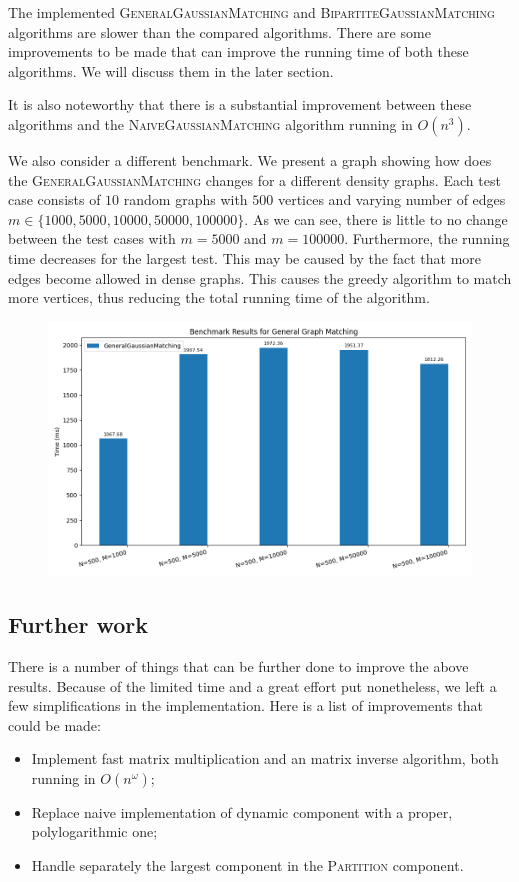 The implemented \textsc{GeneralGaussianMatching} and \textsc{BipartiteGaussianMatching} algorithms are slower than the compared algorithms. There are some improvements to be made that can improve the running time of both these algorithms. We will discuss them in the later section.

It is also noteworthy that there is a substantial improvement between these algorithms and the \textsc{NaiveGaussianMatching} algorithm running in $O(n^3)$.

We also consider a different benchmark. We present a graph showing how does the \textsc{GeneralGaussianMatching} changes for a different density graphs. Each test case consists of $10$ random graphs with $500$ vertices and varying number of edges $m\in\{1000,5000,10000,50000,100000\}$. As we can see, there is little to no change between the test cases with $m = 5000$ and $m = 100000$. Furthermore, the running time decreases for the largest test. This may be caused by the fact that more edges become allowed in dense graphs. This causes the greedy algorithm to match more vertices, thus reducing the total running time of the algorithm.

\begin{figure}[H]
\centering\includegraphics[width=\linewidth]{4_implementation/plots/plot_gen_matching_2.png}
\end{figure}

\subsection{Further work}
There is a number of things that can be further done to improve the above results. Because of the limited time and a great effort put nonetheless, we left a few simplifications in the implementation. Here is a list of improvements that could be made:
\begin{itemize}
    \item Implement fast matrix multiplication and an matrix inverse algorithm, both running in $O(n^\omega)$;
    \item Replace naive implementation of dynamic component with a proper, polylogarithmic one;
    \item Handle separately the largest component in the \textsc{Partition} component.
\end{itemize}


